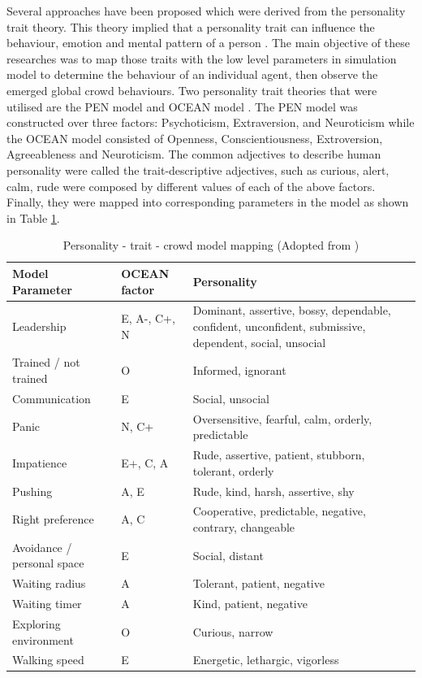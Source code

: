 Several approaches have been proposed which were derived from the personality trait theory. This theory implied that a personality trait can influence the behaviour, emotion and mental pattern of a person \citep{Durupinar2008}. The main objective of these researches was to map those traits with the low level parameters in simulation model to determine the behaviour of an individual agent, then observe the emerged global crowd behaviours. Two personality trait theories that were utilised are the PEN model \citep{Guy2011} and OCEAN model \citep{Durupinar2008,Durupinar2011}. The PEN model was constructed over three factors: Psychoticism, Extraversion, and Neuroticism while the OCEAN model consisted of Openness, Conscientiousness, Extroversion, Agreeableness and Neuroticism. The common adjectives to describe human personality were called the trait-descriptive adjectives, such as curious, alert, calm, rude were composed by different values of each of the above factors. Finally, they were mapped into corresponding parameters in the model as shown in Table \ref{table:oceanPersonality}.

\begin{table}[!htbp]
	\caption{Personality - trait - crowd model mapping (Adopted from \citet{Durupinar2008})}
	\label{table:oceanPersonality}
	\centering
	\begin{tabular}{|l|l|p{6.5cm}|}
		\hline
		\textbf{Model Parameter} & \textbf{OCEAN factor} & \textbf{Personality} \\ \hline \hline
		Leadership & E, A-, C+, N & Dominant, assertive, bossy, dependable, confident, unconfident, submissive, dependent, social, unsocial \\ \hline
		Trained / not trained & O & Informed, ignorant \\ \hline
		Communication & E & Social, unsocial \\ \hline
		Panic & N, C+ & Oversensitive, fearful, calm, orderly, predictable \\ \hline
		Impatience & E+, C, A & Rude, assertive, patient, stubborn, tolerant, orderly \\ \hline
		Pushing & A, E & Rude, kind, harsh, assertive, shy \\ \hline
		Right preference & A, C & Cooperative, predictable, negative, contrary, changeable \\ \hline
		Avoidance / personal space & E & Social, distant \\ \hline
		Waiting radius & A & Tolerant, patient, negative \\ \hline
		Waiting timer & A & Kind, patient, negative \\ \hline
		Exploring environment & O & Curious, narrow \\ \hline
		Walking speed & E & Energetic, lethargic, vigorless \\ \hline
	\end{tabular}
\end{table}

